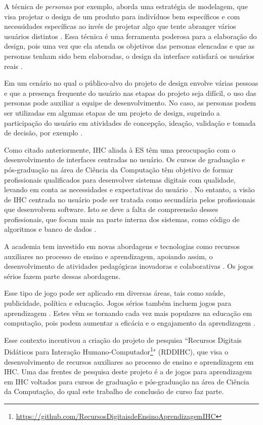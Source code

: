 A técnica de \textit{personas} por exemplo, aborda uma estratégia de modelagem, que visa projetar o design de um produto para indivíduos bem específicos e com necessidades específicas ao invés de projetar algo que tente abranger vários usuários distintos \cite[p. 77]{cooper07}. Essa técnica é uma ferramenta poderosa para a elaboração do design, pois uma vez que ela atenda os objetivos das personas elencadas e que as personas tenham sido bem elaboradas, o design da interface satisfará os usuários reais \cite[p. 77]{cooper07}.

Em um cenário no qual o público-alvo do projeto de design envolve várias pessoas e que a presença frequente do usuário nas etapas do projeto seja difícil, o uso das personas pode auxiliar a equipe de desenvolvimento. No caso, as personas podem ser utilizadas em algumas etapas de um projeto de design, suprindo a participação do usuário em atividades de concepção, ideação, validação e tomada de decisão, por exemplo \cite[p. 80]{Vianna_2014} \cite[p. 155]{BarbosaEtAl2021}.

Como citado anteriormente, IHC aliada à ES têm uma preocupação com o desenvolvimento de interfaces centradas no usuário. Os cursos de graduação e pós-graduação na área de Ciência da Computação têm objetivo de formar profissionais qualificados para desenvolver sistemas digitais com qualidade, levando em conta as necessidades e expectativas do usuário \cite[p. 89,  90]{acm_curricula} \cite[p. 8-16]{BarbosaEtAl2021}. No entanto, a visão de IHC centrada no usuário pode ser tratada como secundária pelos profissionais que desenvolvem software. Isto se deve a falta de compreensão desses profissionais, que focam mais na parte interna dos sistemas, como código de algoritmos e banco de dados \cite{sommariva}.

A academia tem investido em novas abordagens e tecnologias como recursos auxiliares no processo de ensino e aprendizagem, apoiando assim, o desenvolvimento de atividades pedagógicas inovadoras e colaborativas \cite{battistella, brito, Sales2020,Sales2020UsoTDS}. Os jogos sérios fazem parte dessas abordagens.

Esse tipo de jogo pode ser aplicado em diversas áreas, tais como saúde, publicidade, política e educação. Jogos
sérios também incluem jogos para aprendizagem \cite{Becker_2021}. Estes vêm se tornando cada vez mais populares na educação em computação, pois podem
aumentar a eficácia e o engajamento da aprendizagem \cite{battistella, brito, queiroz, sales_climaco2016}.

Esse contexto incentivou a criação do projeto de pesquisa ``Recursos Digitais Didáticos para Interação Humano-Computador\footnote{\url{https://github.com/RecursosDigitaisdeEnsinoAprendizagemIHC}}" (RDDIHC), que visa o desenvolvimento de recursos auxiliares ao processo de ensino e aprendizagem em IHC. Uma das frentes de pesquisa deste projeto é a de jogos para aprendizagem em IHC voltados para cursos de graduação e pós-graduação na área de Ciência da Computação, do qual este trabalho de conclusão de curso faz parte.

